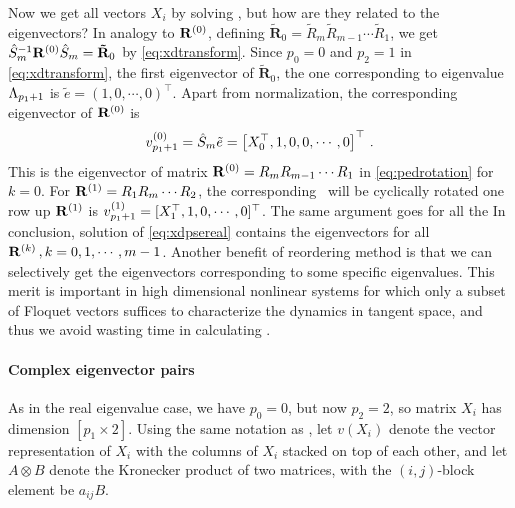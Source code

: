 \documentclass[final,leqno,onefignum,onetabnum]{siamltexmm}
\begin{document}
Now we get all vectors $X_{i}$ by solving \pse, but how are they related
to the eigenvectors? In analogy to $\mathbf{R}^{(0)}$, defining
$\mathbf{\tilde{R}}_{0}=\tilde{R}_{m}\tilde{R}_{m-1}\cdots
\tilde{R}_{1}$, we get
$\hat{S}_{m}^{-1}\mathbf{R}^{(0)}\hat{S}_{m}=\mathbf{\tilde{R}}_{0}$ by
\eqref{eq:xdtransform}. Since $p_{0}=0$ and $p_{2}=1$ in
\eqref{eq:xdtransform}, the first eigenvector of
$\mathbf{\tilde{R}}_{0}$, the one corresponding to eigenvalue
$\Lambda_{p_1+1}$
is $\tilde{e}=(1,0,\cdots , 0)^\top $. Apart from
normalization, the corresponding eigenvector of $\mathbf{R}^{(0)}$ is
\[
v_{p_{1}+1}^{(0)}=\hat{S}_{m}\tilde{e}
 = \left[X_{0}^\top , 1, 0, 0, \cdots, 0 \right]^\top
\,.
\]
This is the eigenvector of matrix $\mathbf{R}^{(0)}=R_{m}R_{m-1}\cdots R_{1}$ in
\eqref{eq:pedrotation} for $k=0$. For $\mathbf{R}^{(1)}=R_{1}R_{m}\cdots R_{2}$,
the corresponding \pse\ will be cyclically rotated one row up 
$\mathbf{R}^{(1)}$ is $v_{p_{1}+1}^{(1)}=[X_{1}^\top,1,0,\cdots,0]^\top $. The
same argument goes for all the 
In conclusion, solution of \eqref{eq:xdpsereal} contains the eigenvectors
for all $\mathbf{R}^{(k)}\,,k=0,1,\cdots,m-1$.
Another benefit of reordering method is that we can selectively
get the eigenvectors corresponding to some specific eigenvalues.
This merit is important in high dimensional nonlinear systems for
which only a subset of Floquet vectors suffices to characterize the
dynamics in tangent space, and thus we avoid wasting time in calculating
.

\paragraph{Complex eigenvector pairs}
As in the real eigenvalue case, we have $p_{0}=0$, but now $p_{2}=2$, so
matrix $X_{i}$  has dimension $[p_{1}\!\times\! 2]$. Using the same
notation as , let $v(X_{i})$ denote the vector
representation of $X_{i}$ with the columns of $X_{i}$ stacked on top of
each other, and let $A\otimes B$ denote the Kronecker product of two
matrices, with the $(i,j)$-block element be $a_{ij}B$.
\end{document}
